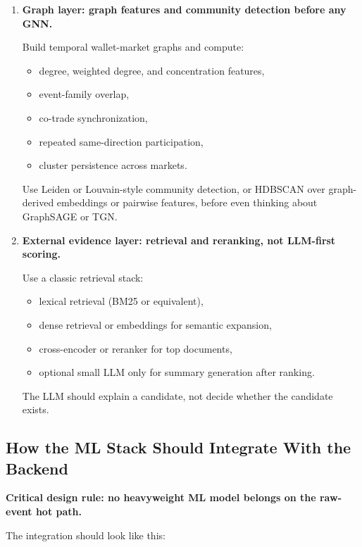 \documentclass[11pt,letterpaper]{article}
\begin{document}
\begin{enumerate}[leftmargin=1.5em]
    \textbf{Do not start with:} generic sequence transformers. They are expensive, hard to calibrate, and unnecessary at this maturity level.

    \item \textbf{Graph layer: graph features and community detection before any GNN.}

    Build temporal wallet-market graphs and compute:
    \begin{itemize}[nosep]
        \item degree, weighted degree, and concentration features,
        \item event-family overlap,
        \item co-trade synchronization,
        \item repeated same-direction participation,
        \item cluster persistence across markets.
    \end{itemize}

    Use Leiden or Louvain-style community detection, or HDBSCAN over graph-derived embeddings or pairwise features, before even thinking about GraphSAGE or TGN.

    \item \textbf{External evidence layer: retrieval and reranking, not LLM-first scoring.}

    Use a classic retrieval stack:
    \begin{itemize}[nosep]
        \item lexical retrieval (BM25 or equivalent),
        \item dense retrieval or embeddings for semantic expansion,
        \item cross-encoder or reranker for top documents,
        \item optional small LLM only for summary generation after ranking.
    \end{itemize}

    The LLM should explain a candidate, not decide whether the candidate exists.
\end{enumerate}

\subsection{How the ML Stack Should Integrate With the Backend}

\textbf{Critical design rule: no heavyweight ML model belongs on the raw-event hot path.}

The integration should look like this:
\end{document}
